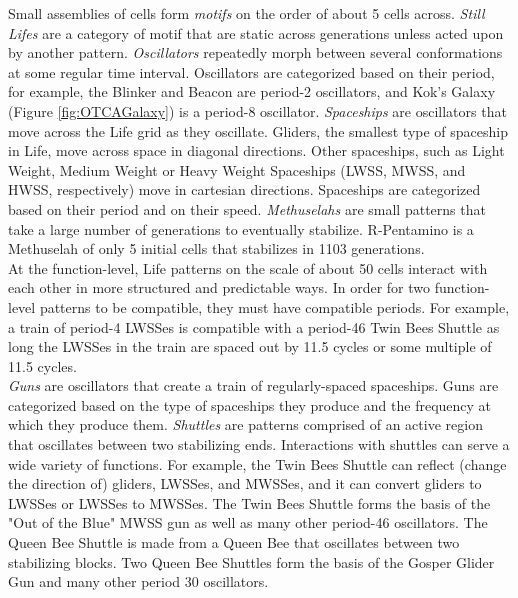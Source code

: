 {Small assemblies of cells form \textit{motifs} on the order of about 5 cells across.  \textit{Still Lifes} are a category of motif that are static across generations unless acted upon by another pattern.  \textit{Oscillators} repeatedly morph between several conformations at some regular time interval.  Oscillators are categorized based on their period, for example, the Blinker and Beacon are period-2 oscillators, and Kok's Galaxy (Figure \ref{fig:OTCAGalaxy}) is a period-8 oscillator.  \textit{Spaceships} are oscillators that move across the Life grid as they oscillate.  Gliders, the smallest type of spaceship in Life, move across space in diagonal directions.  Other spaceships, such as Light Weight, Medium Weight or Heavy Weight Spaceships (LWSS, MWSS, and HWSS, respectively) move in cartesian directions.  Spaceships are categorized based on their period and on their speed.  \textit{Methuselahs} are small patterns that take a large number of generations to eventually stabilize.  R-Pentamino is a Methuselah of only 5 initial cells that stabilizes in 1103 generations.\\

At the function-level, Life patterns on the scale of about 50 cells interact with each other in more structured and predictable ways.  In order for two function-level patterns to be compatible, they must have compatible periods.  For example, a train of period-4 LWSSes is compatible with a period-46 Twin Bees Shuttle as long the LWSSes in the train are spaced out by 11.5 cycles or some multiple of 11.5 cycles.\\

\textit{Guns} are oscillators that create a train of regularly-spaced spaceships.  Guns are categorized based on the type of spaceships they produce and the frequency at which they produce them.  \textit{Shuttles} are patterns comprised of an active region that oscillates between two stabilizing ends.  Interactions with shuttles can serve a wide variety of functions.  For example, the Twin Bees Shuttle can reflect (change the direction of) gliders, LWSSes, and MWSSes, and it can convert gliders to LWSSes or LWSSes to MWSSes.  The Twin Bees Shuttle forms the basis of the "Out of the Blue" MWSS gun as well as many other period-46 oscillators.  The Queen Bee Shuttle  is made from a Queen Bee that oscillates between two stabilizing blocks.  Two Queen Bee Shuttles form the basis of the Gosper Glider Gun and many other period 30 oscillators.\\

}
